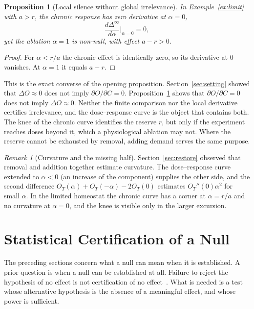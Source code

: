 \documentclass[11pt]{article}
\newtheorem{proposition}[theorem]{Proposition}
\theoremstyle{definition}
\theoremstyle{remark}
\newtheorem{remark}[theorem]{Remark}
\begin{document}
\begin{proposition}[Local silence without global irrelevance]\label{prop:local}
In Example~\ref{ex:limit} with $a>r$, the chronic response has zero derivative at $\alpha=0$,
\[
\frac{d\Delta^\infty}{d\alpha}\Big|_{\alpha=0}=0,
\]
yet the ablation $\alpha=1$ is non-null, with effect $a-r>0$.
\end{proposition}
\begin{proof}
For $\alpha<r/a$ the chronic effect is identically zero, so its derivative at $0$ vanishes. At $\alpha=1$ it equals $a-r$.
\end{proof}

This is the exact converse of the opening proposition. Section~\ref{sec:setting} showed that $\Delta O\approx0$ does not imply $\partial O/\partial C=0$. Proposition~\ref{prop:local} shows that $\partial O/\partial C=0$ does not imply $\Delta O\approx0$. Neither the finite comparison nor the local derivative certifies irrelevance, and the dose--response curve is the object that contains both. The knee of the chronic curve identifies the reserve $r$, but only if the experiment reaches doses beyond it, which a physiological ablation may not. Where the reserve cannot be exhausted by removal, adding demand serves the same purpose.

\begin{remark}[Curvature and the missing half]
Section~\ref{sec:restore} observed that removal and addition together estimate curvature. The dose--response curve extended to $\alpha<0$ (an increase of the component) supplies the other side, and the second difference $O_T(\alpha)+O_T(-\alpha)-2O_T(0)$ estimates $O_T''(0)\alpha^2$ for small $\alpha$. In the limited homeostat the chronic curve has a corner at $\alpha=r/a$ and no curvature at $\alpha=0$, and the knee is visible only in the larger excursion.
\end{remark}

\section{Statistical Certification of a Null}\label{sec:stat}

The preceding sections concern what a null can mean when it is established. A prior question is when a null can be established at all. Failure to reject the hypothesis of no effect is not certification of no effect~\cite{altman1995}. What is needed is a test whose alternative hypothesis is the absence of a meaningful effect, and whose power is sufficient.
\end{document}
